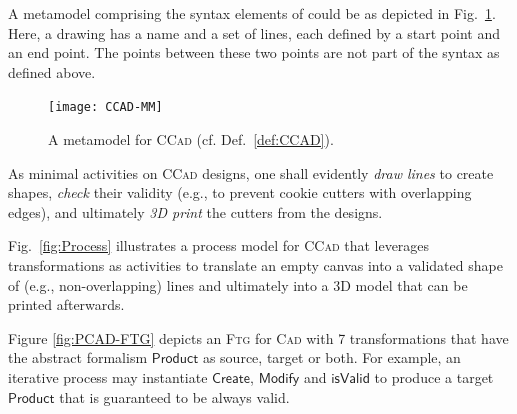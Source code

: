 A metamodel comprising the syntax elements of \CCAD could be as depicted in
Fig.~\ref{fig:PCAD-MM}. Here, a \CCAD drawing has a name and a set of lines, each
defined by a start point and an end point. The points between these two
points are not part of the \CCAD syntax as defined above.

\begin{figure}[t]
\centering
\texttt{[image: CCAD-MM]}
\caption{A metamodel for \textsc{CCad} (cf. Def.~\ref{def:CCAD}).}
\label{fig:PCAD-MM}%
\end{figure}

As minimal activities on \textsc{CCad} designs, one shall evidently \emph{draw
lines} to create shapes, \emph{check} their validity (e.g., to prevent cookie
cutters with overlapping edges), and ultimately \emph{3D print} the cutters
from the designs.


Fig.~\ref{fig:Process} illustrates a process model for \textsc{CCad} that
leverages transformations as activities to translate an empty canvas into a
validated shape of (e.g., non-overlapping) lines and ultimately into a 3D model
that can be printed afterwards.

\begin{Example}
   Figure \ref{fig:PCAD-FTG} depicts an \textsc{Ftg} for \textsc{Cad} with 7 
transformations that have the abstract formalism $\mathsf{Product}$ as source, 
target or both. For example, an iterative process may instantiate 
$\mathsf{Create}$, $\mathsf{Modify}$ and $\mathsf{isValid}$ to produce a target 
$\mathsf{Product}$ that is guaranteed to be always valid.  
\end{Example}


